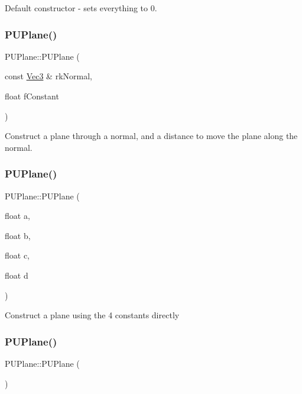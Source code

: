 Default constructor -\/ sets everything to 0. \mbox{\label{classPUPlane_a58477f1c39a22c2c6feddb85c1559544}} 
\subsubsection{\texorpdfstring{P\+U\+Plane()}{PUPlane()}\hspace{0.1cm}{\footnotesize\ttfamily [2/6]}}
{\footnotesize\ttfamily P\+U\+Plane\+::\+P\+U\+Plane (\begin{DoxyParamCaption}\item[{const \hyperlink{classVec3}{Vec3} \&}]{rk\+Normal,  }\item[{float}]{f\+Constant }\end{DoxyParamCaption})}

Construct a plane through a normal, and a distance to move the plane along the normal. \mbox{\label{classPUPlane_af65211380d976874fee10f0ed0122535}} 
\subsubsection{\texorpdfstring{P\+U\+Plane()}{PUPlane()}\hspace{0.1cm}{\footnotesize\ttfamily [3/6]}}
{\footnotesize\ttfamily P\+U\+Plane\+::\+P\+U\+Plane (\begin{DoxyParamCaption}\item[{float}]{a,  }\item[{float}]{b,  }\item[{float}]{c,  }\item[{float}]{d }\end{DoxyParamCaption})}

Construct a plane using the 4 constants directly \mbox{\label{classPUPlane_aaf50baadbaeb2624cfbecb6ca2dbff78}} 
\subsubsection{\texorpdfstring{P\+U\+Plane()}{PUPlane()}\hspace{0.1cm}{\footnotesize\ttfamily [4/6]}}
{\footnotesize\ttfamily P\+U\+Plane\+::\+P\+U\+Plane (\begin{DoxyParamCaption}{ }\end{DoxyParamCaption})}

